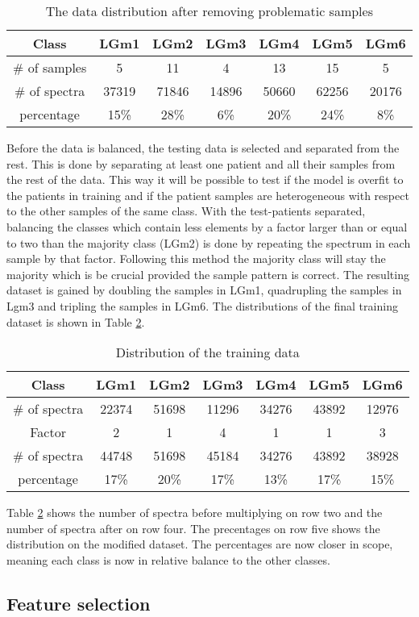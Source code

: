 \begin{table}[h!]
\centering
 \begin{tabular}{||c c c c c c c||} 
 \hline
 Class & LGm1 & LGm2 & LGm3 & LGm4 & LGm5 & LGm6 \\ [0.5ex] 
 \hline\hline
 \# of samples & 5& 11 & 4 & 13 & 15 & 5 \\ 
 \hline
 \# of spectra & 37319 & 71846 & 14896 & 50660 & 62256 & 20176 \\
 \hline
 percentage & 15\%& 28\% & 6\% & 20\% & 24\% & 8\% \\
 \hline

\end{tabular}
\caption{The data distribution after removing problematic samples}
\label{table:2}
\end{table}


Before the data is balanced, the testing data is selected and separated from the rest. This is done by separating at least one patient and all their samples from the rest of the data. This way it will be possible to test if the model is overfit to the patients in training and if the patient samples are heterogeneous  with respect to the other samples of the same class. With the test-patients separated, balancing the classes which contain less elements by a factor larger than or equal to two than the majority class (LGm2) is done by repeating the spectrum in each sample by that factor. Following this method the majority class will stay the majority which is be crucial provided the sample pattern is correct. The resulting dataset is gained by doubling the samples in LGm1, quadrupling the samples in Lgm3 and tripling the samples in LGm6. The distributions of the final training dataset is shown in Table \ref{table:3}.


\begin{table}[h!]
\centering
 \begin{tabular}{||c c c c c c c||} 
 \hline
 Class & LGm1 & LGm2 & LGm3 & LGm4 & LGm5 & LGm6 \\ [0.5ex] 
 \hline\hline
\# of spectra & 22374	& 51698	& 11296	& 34276	& 43892	& 12976 \\
 \hline 
 Factor  & 2 & 1 & 4 & 1 & 1 & 3 \\
 \hline 
 \# of spectra & 44748 & 51698 & 45184 & 34276 & 43892 & 38928 \\
 \hline
 percentage & 17\%& 20\% & 17\% & 13\% & 17\% & 15\% \\
 \hline

\end{tabular}
\caption{Distribution of the training data}
\label{table:3}
\end{table}

Table \ref{table:3} shows the number of spectra before multiplying on row two and the number of spectra after on row four. The precentages on row five shows the distribution on the modified dataset. The percentages are now closer in scope,  meaning each class is now in relative balance to the other classes.

\subsection{Feature selection}